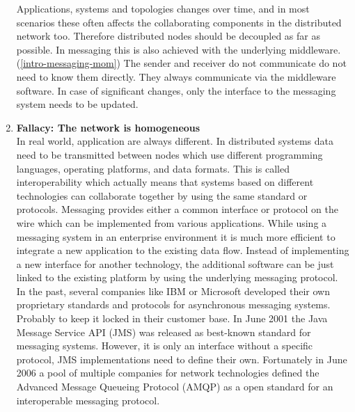 \begin{enumerate}
{        Applications, systems and topologies changes over time, and in most
        scenarios these often affects the collaborating components in the
        distributed network too. Therefore distributed nodes should be decoupled as
        far as possible. In messaging this is also achieved with the underlying
        middleware.(\ref{intro-messaging-mom}) The sender and receiver do not
        communicate do not need to know them directly. They always communicate
        via the middleware software. In case of significant changes, only the
        interface to the messaging system needs to be updated. }
    \item{\textbf{Fallacy: The network is homogeneous}\hfill \\
        In real world, application are always different. In distributed systems
        data need to be transmitted between nodes which use different
        programming languages, operating platforms, and data formats.
        This is called interoperability  which actually means that
        systems based on different technologies can collaborate together by using
        the same standard or protocols. Messaging provides either a common
        interface or protocol on the wire which can be implemented from various
        applications. While using a messaging system in an
        enterprise environment it is much more efficient to integrate a new
        application to the existing data flow. Instead of implementing a new
        interface for another technology, the additional software can be just
        linked to the existing platform by using the underlying messaging
        protocol.\\

        In the past, several companies like IBM or Microsoft developed their own
        proprietary standards and protocols for asynchronous messaging systems.
        Probably to keep it locked in their customer base. In June 2001 the Java
        Message Service API (JMS) was released as best-known standard for
        messaging systems. However, it is only an interface without a specific
        protocol, JMS implementations need to define their own. Fortunately in
        June 2006 a pool of multiple companies for network technologies defined
        the Advanced Message Queueing Protocol (AMQP) as a open standard for an
        interoperable messaging protocol. \cite{PrpAMQP}
    }

\end{enumerate}\cite{EIP03}\cite{fallacies}

